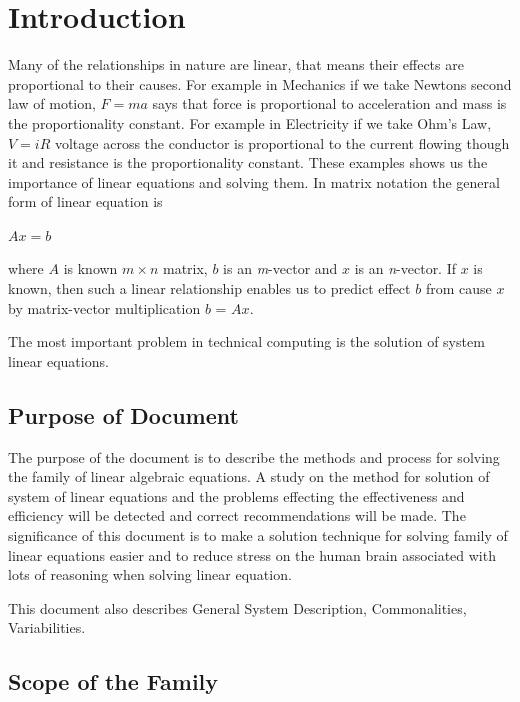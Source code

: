 \documentclass[12pt]{article}
\begin{document}
\newpage
{}

\section{Introduction}

Many of the relationships in nature are linear, that means their effects are
proportional to their causes. For example in Mechanics if we take Newtons second
law of motion, \textbf{$F = ma$} says that force is proportional to acceleration
and mass is the proportionality constant. For example in Electricity if we take
Ohm's Law, \textbf{$V = iR$} voltage across the conductor is proportional to the
current flowing though it and resistance is the proportionality constant. These
examples shows us the importance of linear equations and solving them. In matrix
notation the general form of linear equation is

 \centerline{\textbf{$Ax = b$}}

where \textbf{$A$} is known \textit{$m \times n$} matrix, \textbf{$b$} is an
\textit{m}-vector and \textbf{$x$} is an \textit{n}-vector. If \textbf{$x$} is
known, then such a linear relationship enables us to predict effect \textbf{$b$}
from cause \textbf{$x$} by matrix-vector multiplication \textbf{$b$} =
\textbf{$A$}\textbf{$x$}.

The most important problem in technical computing is the solution of system
linear equations.



\subsection{Purpose of Document}

The purpose of the document is to describe the methods and process for solving
the family of linear algebraic equations. A study on the method for solution of
system of linear equations and the problems effecting the effectiveness and
efficiency will be detected and correct recommendations will be made. The
significance of this document is to make a solution technique for solving family
of linear equations easier and to reduce stress on the human brain associated
with lots of reasoning when solving linear equation.

This document also describes General System Description, Commonalities,
Variabilities.

\subsection{Scope of the Family} 
\end{document}
